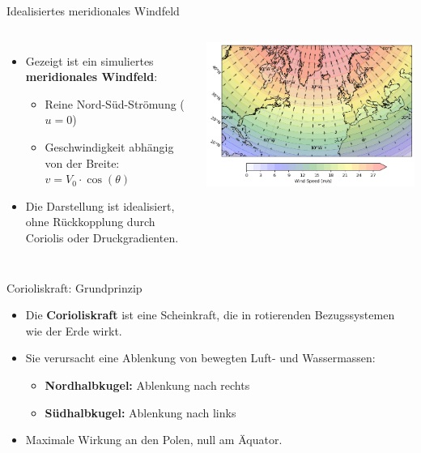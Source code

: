   
  \begin{frame}{Idealisiertes meridionales Windfeld}
    \begin{columns}
        \begin{itemize}
            \item Gezeigt ist ein simuliertes \textbf{meridionales Windfeld}:
            \begin{itemize}
                \item Reine Nord-Süd-Strömung (\(u = 0\))
                \item Geschwindigkeit abhängig von der Breite: \(v = V_0 \cdot \cos(\theta)\)
            \end{itemize}
            \item Die Darstellung ist idealisiert, ohne Rückkopplung durch Coriolis oder Druckgradienten.
        \end{itemize}
        
      
        \includegraphics[width=\linewidth]{../images/meridional_wind_plot.png}
  
    \end{columns}
  \end{frame}

  \begin{frame}{Corioliskraft: Grundprinzip}
    \begin{itemize}
        \item Die \textbf{Corioliskraft} ist eine Scheinkraft, die in rotierenden Bezugssystemen wie der Erde wirkt.
        \item Sie verursacht eine Ablenkung von bewegten Luft- und Wassermassen:
        \begin{itemize}
            \item \textbf{Nordhalbkugel:} Ablenkung nach rechts
            \item \textbf{Südhalbkugel:} Ablenkung nach links
        \end{itemize}
        \item Maximale Wirkung an den Polen, null am Äquator.
    \end{itemize}
    \end{frame}
    
